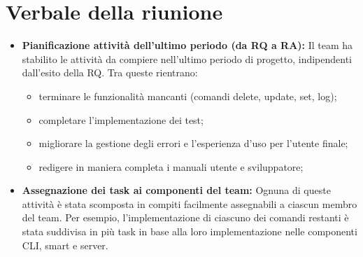 \section{Verbale della riunione}
	\begin{itemize}
		\item \textbf{Pianificazione attività dell'ultimo periodo (da RQ a RA):}
		Il team ha stabilito le attività da compiere nell'ultimo periodo di progetto, indipendenti dall'esito della RQ. Tra queste rientrano:
		\begin{itemize}
			\item terminare le funzionalità mancanti (comandi delete, update, set, log);
			\item completare l'implementazione dei test;
			\item migliorare la gestione degli errori e l'esperienza d'uso per l'utente finale;
			\item redigere in maniera completa i manuali utente e sviluppatore;
		\end{itemize}

		\item \textbf{Assegnazione dei task ai componenti del team:}
		Ognuna di queste attività è stata scomposta in compiti facilmente assegnabili a ciascun membro del team. Per esempio, l'implementazione di ciascuno dei comandi restanti è stata suddivisa in più task in base alla loro implementazione nelle componenti CLI, smart e server.

	\end{itemize}
